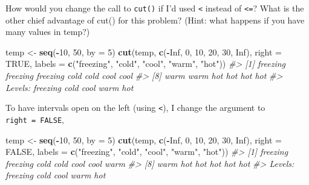 \documentclass[]{book}
\newenvironment{Shaded}{\begin{snugshade}}{\end{snugshade}}
\newcommand{\CommentTok}[1]{\textcolor[rgb]{0.56,0.35,0.01}{\textit{#1}}}
\newcommand{\DataTypeTok}[1]{\textcolor[rgb]{0.13,0.29,0.53}{#1}}
\newcommand{\DecValTok}[1]{\textcolor[rgb]{0.00,0.00,0.81}{#1}}
\newcommand{\KeywordTok}[1]{\textcolor[rgb]{0.13,0.29,0.53}{\textbf{#1}}}
\newcommand{\NormalTok}[1]{#1}
\newcommand{\OperatorTok}[1]{\textcolor[rgb]{0.81,0.36,0.00}{\textbf{#1}}}
\newcommand{\OtherTok}[1]{\textcolor[rgb]{0.56,0.35,0.01}{#1}}
\newcommand{\StringTok}[1]{\textcolor[rgb]{0.31,0.60,0.02}{#1}}
\theoremstyle{plain}
\theoremstyle{remark}
\begin{document}
How would you change the call to \texttt{cut()} if I'd used \texttt{\textless{}} instead of \texttt{\textless{}=}? What is the other chief advantage of cut() for this problem? (Hint: what happens if you have many values in temp?)

\begin{Shaded}
\begin{Highlighting}[]
\NormalTok{temp <-}\StringTok{ }\KeywordTok{seq}\NormalTok{(}\OperatorTok{-}\DecValTok{10}\NormalTok{, }\DecValTok{50}\NormalTok{, }\DataTypeTok{by =} \DecValTok{5}\NormalTok{)}
\KeywordTok{cut}\NormalTok{(temp, }\KeywordTok{c}\NormalTok{(}\OperatorTok{-}\OtherTok{Inf}\NormalTok{, }\DecValTok{0}\NormalTok{, }\DecValTok{10}\NormalTok{, }\DecValTok{20}\NormalTok{, }\DecValTok{30}\NormalTok{, }\OtherTok{Inf}\NormalTok{), }\DataTypeTok{right =} \OtherTok{TRUE}\NormalTok{,}
    \DataTypeTok{labels =} \KeywordTok{c}\NormalTok{(}\StringTok{"freezing"}\NormalTok{, }\StringTok{"cold"}\NormalTok{, }\StringTok{"cool"}\NormalTok{, }\StringTok{"warm"}\NormalTok{, }\StringTok{"hot"}\NormalTok{))}
\CommentTok{#>  [1] freezing freezing freezing cold     cold     cool     cool    }
\CommentTok{#>  [8] warm     warm     hot      hot      hot      hot     }
\CommentTok{#> Levels: freezing cold cool warm hot}
\end{Highlighting}
\end{Shaded}

To have intervals open on the left (using \texttt{\textless{}}), I change the argument to \texttt{right\ =\ FALSE},

\begin{Shaded}
\begin{Highlighting}[]
\NormalTok{temp <-}\StringTok{ }\KeywordTok{seq}\NormalTok{(}\OperatorTok{-}\DecValTok{10}\NormalTok{, }\DecValTok{50}\NormalTok{, }\DataTypeTok{by =} \DecValTok{5}\NormalTok{)}
\KeywordTok{cut}\NormalTok{(temp, }\KeywordTok{c}\NormalTok{(}\OperatorTok{-}\OtherTok{Inf}\NormalTok{, }\DecValTok{0}\NormalTok{, }\DecValTok{10}\NormalTok{, }\DecValTok{20}\NormalTok{, }\DecValTok{30}\NormalTok{, }\OtherTok{Inf}\NormalTok{), }\DataTypeTok{right =} \OtherTok{FALSE}\NormalTok{,}
    \DataTypeTok{labels =} \KeywordTok{c}\NormalTok{(}\StringTok{"freezing"}\NormalTok{, }\StringTok{"cold"}\NormalTok{, }\StringTok{"cool"}\NormalTok{, }\StringTok{"warm"}\NormalTok{, }\StringTok{"hot"}\NormalTok{))}
\CommentTok{#>  [1] freezing freezing cold     cold     cool     cool     warm    }
\CommentTok{#>  [8] warm     hot      hot      hot      hot      hot     }
\CommentTok{#> Levels: freezing cold cool warm hot}
\end{Highlighting}
\end{Shaded}
\end{document}
